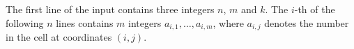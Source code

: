 The first line of the input contains three integers $n$, $m$ and $k$.
The $i$-th of the following $n$ lines contains $m$ integers $a_{i,1},\ldots,a_{i, m}$,
where $a_{i,j}$ denotes the number in the cell at coordinates $(i,j)$.
